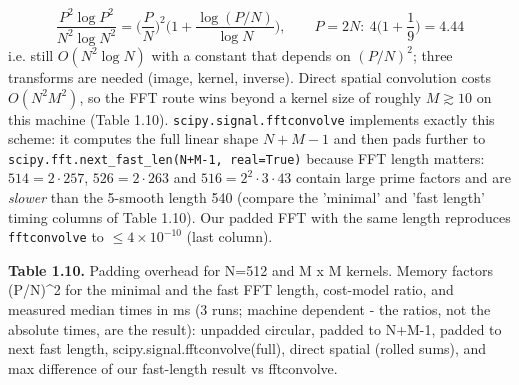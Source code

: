 \documentclass[10pt,a4paper]{article}
\begin{document}
\begin{equation}\frac{P^2\log P^2}{N^2\log N^2}=\Big(\frac{P}{N}\Big)^{2}\Big(1+\frac{\log (P/N)}{\log N}\Big),\qquad P=2N:\ 4\Big(1+\frac{1}{9}\Big)=4.44\end{equation}
i.e. still $O(N^2\log N)$ with a constant that depends on $(P/N)^2$; three transforms are needed (image, kernel, inverse). Direct spatial convolution costs $O(N^2M^2)$, so the FFT route wins beyond a kernel size of roughly $M\gtrsim 10$ on this machine (Table 1.10). \texttt{scipy.\allowbreak{}signal.\allowbreak{}fftconvolve} implements exactly this scheme: it computes the full linear shape $N+M-1$ and then pads further to \texttt{scipy.\allowbreak{}fft.\allowbreak{}next\_\allowbreak{}fast\_\allowbreak{}len(\allowbreak{}N+M-1,\allowbreak{} real=\allowbreak{}True)} because FFT length matters: $514=2\cdot257$, $526=2\cdot263$ and $516=2^2\cdot3\cdot43$ contain large prime factors and are \textit{slower} than the 5-smooth length 540 (compare the 'minimal' and 'fast length' timing columns of Table 1.10). Our padded FFT with the same length reproduces \texttt{fftconvolve} to $\le 4\times10^{-10}$ (last column).

\begin{table}[H]\centering\scriptsize{\small\textbf{Table 1.10.} Padding overhead for N=512 and M x M kernels. Memory factors (P/N)\textasciicircum{}2 for the minimal and the fast FFT length, cost-model ratio, and measured median times in ms (3 runs; machine dependent - the ratios, not the absolute times, are the result): unpadded circular, padded to N+M-1, padded to next fast length, scipy.signal.fftconvolve(full), direct spatial (rolled sums), and max difference of our fast-length result vs fftconvolve.\par}\vskip 3pt
\end{table}
\end{document}
